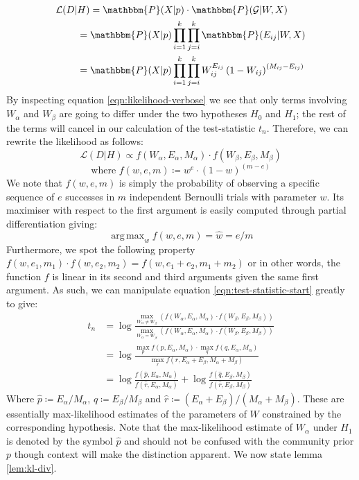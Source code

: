 \documentclass[11pt]{article}
\DeclareMathOperator*{\argmax}{arg\,max}
\newcommand{\Gcal}{\mathcal{G}}
\newcommand{\lik}{\mathcal{L}}
\newcommand{\prob}{\mathbbm{P}}
\begin{document}
\begin{multicols*}{2}
%
\begin{align}
\lik(D | &H) = \prob(X| p) \cdot \prob(\Gcal | W, X) \nonumber \\
&= \prob(X | p) \prod_{i=1}^{k} \prod_{j=i}^{k} \prob(E_{ij} | W, X) \nonumber \\
&= \prob(X | p) \prod_{i=1}^{k} \prod_{j=i}^{k} W_{ij} ^ {E_{ij}} \left( 1 - W_{ij} \right) ^ {(M_{ij} - E_{ij})}
\label{eqn:likelihood-verbose}
\end{align}
%
By inspecting equation \ref{eqn:likelihood-verbose} we see that only terms involving $W_{\alpha}$ and $W_{\beta}$ are going to differ under the two hypotheses $H_0$ and $H_1$; the rest of the terms will cancel in our calculation of the test-statistic $t_n$. Therefore, we can rewrite the likelihood as follows:
%
\begin{equation}
	\lik (D | H) \propto f (W_\alpha, E_\alpha, M_\alpha) \cdot f (W_\beta, E_\beta, M_\beta)
\end{equation} 
\begin{equation}
	\textrm{where } f (w, e, m) \coloneqq w^e \cdot (1-w)^{(m - e)}
	\label{eqn:f-defn}
\end{equation}
%
We note that $f(w, e, m)$ is simply the probability of observing a specific sequence of $e$ successes in $m$ independent Bernoulli trials with parameter $w$. Its maximiser with respect to the first argument is easily computed through partial differentiation giving:
%
\begin{equation}
	\argmax_w f(w, e, m) = \hat{w} = e / m
	\label{eqn:f-maximiser}
\end{equation}
%
Furthermore, we spot the following property $f(w, e_1, m_1) \cdot f(w, e_2, m_2) = f(w, e_1 + e_2, m_1 + m_2)$ or in other words, the function $f$ is linear in its second and third arguments given the same first argument. As such, we can manipulate equation \ref{eqn:test-statistic-start} greatly to give:
%
\begin{align}
	t_n &= \log \frac
	{
		\max_{W_{\alpha} \neq W_{\beta}}(f (W_\alpha, E_\alpha, M_\alpha) \cdot f (W_\beta, E_\beta, M_\beta))
	}
	{
		\max_{W_\alpha = W_\beta} (f (W_\alpha, E_\alpha, M_\alpha) \cdot f (W_\beta, E_\beta, M_\beta))
	} \nonumber \\
	&= \log \frac{
		\max_p f(p, E_\alpha, M_\alpha) \cdot \max_q f(q, E_\alpha, M_\alpha)
	}{
		\max_r f(r, E_\alpha + E_\beta, M_\alpha + M_\beta)
	} \nonumber \\
	&= \log \frac{f(\hat{p}, E_\alpha, M_\alpha)}{f(\hat{r}, E_\alpha, M_\alpha)} + \log \frac{f(\hat{q}, E_\beta, M_\beta)}{f(\hat{r}, E_\beta, M_\beta)}
\end{align}
%
Where $\hat{p} \coloneqq E_\alpha / M_\alpha$, $\hat{q} \coloneqq E_\beta / M_\beta$ and $\hat{r} \coloneqq (E_\alpha + E_\beta) / (M_\alpha + M_\beta)$. These are essentially max-likelihood estimates of the parameters of $W$ constrained by the corresponding hypothesis. Note that the max-likelihood estimate of $W_\alpha$ under $H_1$ is denoted by the symbol $\hat{p}$ and should not be confused with the community prior $p$ though context will make the distinction apparent. We now state lemma \ref{lem:kl-div}.


\end{multicols*}
\end{document}
